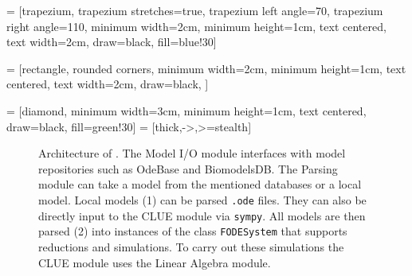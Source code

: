 
 = [trapezium, 
trapezium stretches=true, %
trapezium left angle=70, 
trapezium right angle=110, 
minimum width=2cm, 
minimum height=1cm, text centered, 
text width=2cm, 
draw=black, fill=blue!30]

 = [rectangle, rounded corners, 
minimum width=2cm, 
minimum height=1cm, 
text centered, 
text width=2cm, 
draw=black, 
]

 = [diamond, 
minimum width=3cm, 
minimum height=1cm, 
text centered, 
draw=black, 
fill=green!30]
 = [thick,->,>=stealth]


\begin{figure}
\caption{Architecture of \ToolName. 
    The Model I/O module interfaces with model repositories such as OdeBase and BiomodelsDB. 
    The Parsing module can take a model from the mentioned databases or a local model. 
    Local models (1) can be parsed \texttt{.ode} files. 
    They can also be directly input to the CLUE module via \texttt{sympy}. 
    All models are then parsed (2) into instances of the class \texttt{FODESystem} that supports reductions and simulations. 
    To carry out these simulations the CLUE module uses the Linear Algebra module.
}
\label{fig:clue_arch}
\end{figure}
